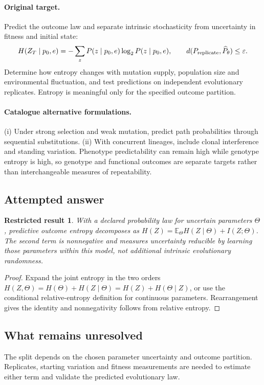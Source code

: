 \documentclass[11pt]{article}
\newcommand{\E}{\mathbb E}
\providecommand{\E}{\mathbb E}
\newtheorem{attemptresult}{Restricted result}[section]
\begin{document}
\paragraph{Original target.}
Predict the outcome law and separate intrinsic stochasticity from uncertainty in fitness and initial state:
\[
H(Z_T\mid p_0,e)=-\sum_zP(z\mid p_0,e)\log_2P(z\mid p_0,e),
\qquad
 d(P_{\rm replicate},\widehat P_\theta)\leq\varepsilon.
\]
Determine how entropy changes with mutation supply, population size and environmental fluctuation, and test predictions on independent evolutionary replicates. Entropy is meaningful only for the specified outcome partition.
\paragraph{Catalogue alternative formulations.}
(i) Under strong selection and weak mutation, predict path probabilities through sequential substitutions. (ii) With concurrent lineages, include clonal interference and standing variation. Phenotype predictability can remain high while genotype entropy is high, so genotype and functional outcomes are separate targets rather than interchangeable measures of repeatability.
\subsection{Attempted answer}
\begin{attemptresult}
With a declared probability law for uncertain parameters $\Theta$, predictive outcome entropy decomposes as $H(Z)=\E_\Theta H(Z\mid\Theta)+I(Z;\Theta)$. The second term is nonnegative and measures uncertainty reducible by learning those parameters within this model, not additional intrinsic evolutionary randomness.
\end{attemptresult}
\begin{proof}
Expand the joint entropy in the two orders $H(Z,\Theta)=H(\Theta)+H(Z\mid\Theta)=H(Z)+H(\Theta\mid Z)$, or use the conditional relative-entropy definition for continuous parameters. Rearrangement gives the identity and nonnegativity follows from relative entropy.
\end{proof}
\subsection{What remains unresolved}
The split depends on the chosen parameter uncertainty and outcome partition. Replicates, starting variation and fitness measurements are needed to estimate either term and validate the predicted evolutionary law.
\end{document}

